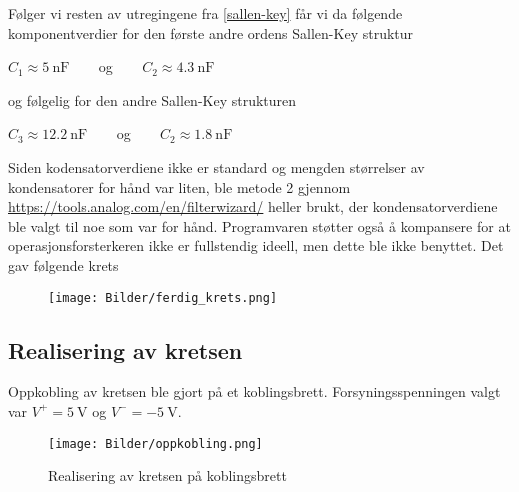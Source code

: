 Følger vi resten av utregingene fra \ref{sallen-key} får vi da følgende komponentverdier for den første 
andre ordens Sallen-Key struktur
\begin{center}
    $C_1 \approx \SI{5}{\nano\farad}\:\:\:\:\:\:\:\:$ og $\:\:\:\:\:\:\:\:C_2 \approx \SI{4.3}{\nano\farad}$
\end{center}

og følgelig for den andre Sallen-Key strukturen
\begin{center}
    $C_3 \approx \SI{12.2}{\nano\farad}\:\:\:\:\:\:\:\:$ og $\:\:\:\:\:\:\:\:C_2 \approx \SI{1.8}{\nano\farad}$
\end{center}

Siden kodensatorverdiene ikke er standard og mengden størrelser av kondensatorer for hånd var liten, ble 
metode 2 gjennom \url{https://tools.analog.com/en/filterwizard/} heller brukt, der kondensatorverdiene ble valgt 
til noe som var for hånd. Programvaren støtter også å kompansere for at operasjonsforsterkeren ikke er fullstendig 
ideell, men dette ble ikke benyttet. Det gav følgende krets

\begin{figure}[H]
    \centering
    \texttt{[image: Bilder/ferdig\_krets.png]}
\end{figure}

\subsection{Realisering av kretsen}
Oppkobling av kretsen ble gjort på et koblingsbrett. Forsyningsspenningen valgt var $V^+ = \SI{5}{\volt}$ og 
$V^- = \SI{-5}{\volt}$.
\begin{figure}[H]
    \centering
    \texttt{[image: Bilder/oppkobling.png]}
    \caption{Realisering av kretsen på koblingsbrett}
    \label{fig:realisering-img}
\end{figure}
